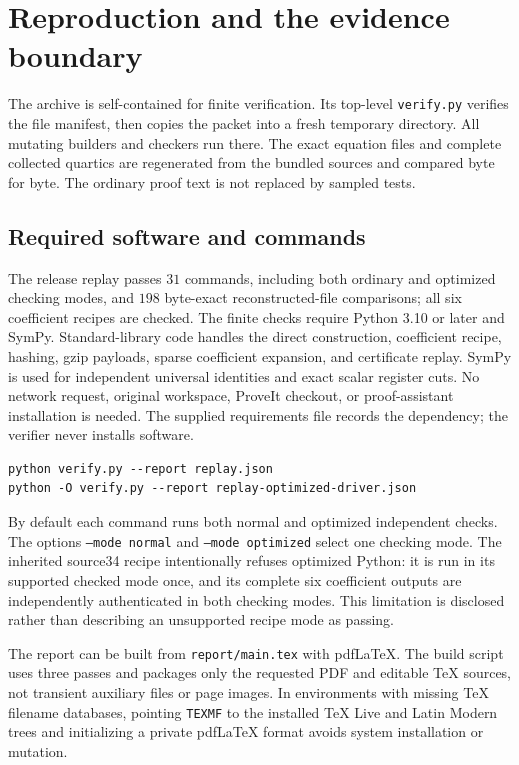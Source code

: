 \section{Reproduction and the evidence boundary}
The archive is self-contained for finite verification. Its top-level \texttt{verify.py} verifies the file manifest, then copies the packet into a fresh temporary directory. All mutating builders and checkers run there. The exact equation files and complete collected quartics are regenerated from the bundled sources and compared byte for byte. The ordinary proof text is not replaced by sampled tests.

\subsection{Required software and commands}
The release replay passes $31$ commands, including both ordinary and optimized checking modes, and $198$ byte-exact reconstructed-file comparisons; all six coefficient recipes are checked. The finite checks require Python 3.10 or later and SymPy. Standard-library code handles the direct construction, coefficient recipe, hashing, gzip payloads, sparse coefficient expansion, and certificate replay. SymPy is used for independent universal identities and exact scalar register cuts. No network request, original workspace, ProveIt checkout, or proof-assistant installation is needed. The supplied requirements file records the dependency; the verifier never installs software.
\begin{verbatim}
python verify.py --report replay.json
python -O verify.py --report replay-optimized-driver.json
\end{verbatim}
By default each command runs both normal and optimized independent checks. The options \texttt{--mode normal} and \texttt{--mode optimized} select one checking mode. The inherited source34 recipe intentionally refuses optimized Python: it is run in its supported checked mode once, and its complete six coefficient outputs are independently authenticated in both checking modes. This limitation is disclosed rather than describing an unsupported recipe mode as passing.

The report can be built from \texttt{report/main.tex} with pdfLaTeX. The build script uses three passes and packages only the requested PDF and editable TeX sources, not transient auxiliary files or page images. In environments with missing TeX filename databases, pointing \texttt{TEXMF} to the installed TeX Live and Latin Modern trees and initializing a private pdfLaTeX format avoids system installation or mutation.

